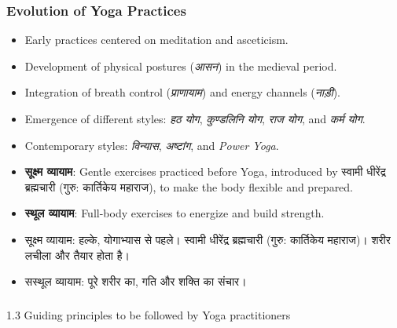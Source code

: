 \begin{frame}[fragile]\frametitle{Evolution of Yoga Practices}

      \begin{itemize}
		\item Early practices centered on meditation and asceticism.
		\item Development of physical postures (\textit{आसन}) in the medieval period.
		\item Integration of breath control (\textit{प्राणायाम}) and energy channels (\textit{नाड़ी}).
		\item Emergence of different styles: \textit{हठ योग}, \textit{कुण्डलिनि योग}, \textit{राज योग}, and \textit{कर्म योग}.
		\item Contemporary styles: \textit{विन्यास}, \textit{अष्टांग}, and \textit{Power Yoga}.
		\item \textbf{सूक्ष्म व्यायाम}: Gentle exercises practiced before Yoga, introduced by स्वामी धीरेंद्र ब्रह्मचारी (गुरु: कार्तिकेय महाराज), to make the body flexible and prepared.
		\item \textbf{स्थूल व्यायाम}: Full-body exercises to energize and build strength.

		\item सूक्ष्म व्यायाम: हल्के, योगाभ्यास से पहले। स्वामी धीरेंद्र ब्रह्मचारी (गुरु: कार्तिकेय महाराज)। शरीर लचीला और तैयार होता है।
		\item सस्थूल व्यायाम: पूरे शरीर का, गति और शक्ति का संचार।
	  \end{itemize}

\end{frame}



\begin{frame}[fragile]\frametitle{}
\begin{center}
{\Large 1.3 Guiding principles to be followed by Yoga practitioners}
\end{center}
\end{frame}

